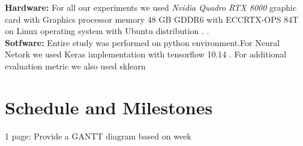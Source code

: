 \textbf{Hardware:} For all our experiments we used \textit{Nvidia Quadro RTX 8000} graphic card with Graphics processor memory 48 GB GDDR6 with ECCRTX-OPS 84T on Linux operating system with Ubuntu distribution . .\\ 

\textbf{Sotfware:} Entire study was performed on python environment.For Neural Netork we used Keras implementation with tensorflow 10.14 \cite{tensorflow2015-whitepaper}. For additional evaluation metric we also used sklearn



\newpage








\section{Schedule and Milestones}
1 page: Provide a GANTT diagram based on week
